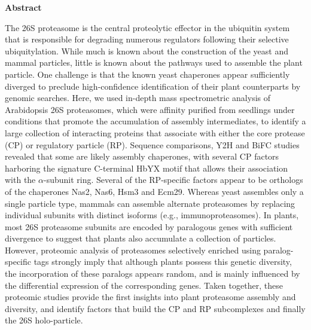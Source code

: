 \textbf{Abstract}

The 26S proteasome is the central proteolytic effector in the ubiquitin system that is responsible for degrading numerous regulators following their selective ubiquitylation.
While much is known about the construction of the yeast and mammal particles, little is known about the pathways used to assemble the plant particle.
One challenge is that the known yeast chaperones appear sufficiently diverged to preclude high-confidence identification of their plant counterparts by genomic searches.
Here, we used in-depth mass spectrometric analysis of Arabidopsis 26S proteasomes, which were affinity purified from seedlings under conditions that promote the accumulation of assembly intermediates, to identify a large collection of interacting proteins that associate with either the core protease (CP) or regulatory particle (RP).
Sequence comparisons, Y2H and BiFC studies revealed that some are likely assembly chaperones, with several CP factors harboring the signature C-terminal HbYX motif that allows their association with the $\alpha$-subunit ring.
Several of the RP-specific factors appear to be orthologs of the chaperones Nas2, Nas6, Hsm3 and Ecm29.
Whereas yeast assembles only a single particle type, mammals can assemble alternate proteasomes by replacing individual subunits with distinct isoforms (e.g., immunoproteasomes).
In plants, most 26S proteasome subunits are encoded by paralogous genes with sufficient divergence to suggest that plants also accumulate a collection of particles.
However, proteomic analysis of proteasomes selectively enriched using paralog-specific tags strongly imply that although plants possess this genetic diversity, the incorporation of these paralogs appears random, and is mainly influenced by the differential expression of the corresponding genes.
Taken together, these proteomic studies provide the first insights into plant proteasome assembly and diversity, and identify factors that build the CP and RP subcomplexes and finally the 26S holo-particle.